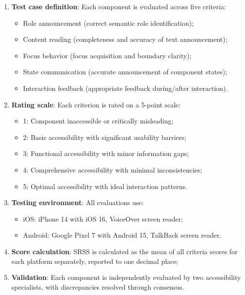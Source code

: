\begin{enumerate}
    \item \textbf{Test case definition}: Each component is evaluated across five criteria:
    \begin{itemize}
        \item Role announcement (correct semantic role identification);
        \item Content reading (completeness and accuracy of text announcement);
        \item Focus behavior (focus acquisition and boundary clarity);
        \item State communication (accurate announcement of component states);
        \item Interaction feedback (appropriate feedback during/after interaction).
    \end{itemize}
    
    \item \textbf{Rating scale}: Each criterion is rated on a 5-point scale:
    \begin{itemize}
        \item 1: Component inaccessible or critically misleading;
        \item 2: Basic accessibility with significant usability barriers;
        \item 3: Functional accessibility with minor information gaps;
        \item 4: Comprehensive accessibility with minimal inconsistencies;
        \item 5: Optimal accessibility with ideal interaction patterns.
    \end{itemize}
    
    \item \textbf{Testing environment}: All evaluations use:
    \begin{itemize}
        \item iOS: iPhone 14 with iOS 16, VoiceOver screen reader;
        \item Android: Google Pixel 7 with Android 15, TalkBack screen reader.
    \end{itemize}
    
    \item \textbf{Score calculation}: SRSS is calculated as the mean of all criteria scores for each platform separately, reported to one decimal place;
    
    \item \textbf{Validation}: Each component is independently evaluated by two accessibility specialists, with discrepancies resolved through consensus.
\end{enumerate}

